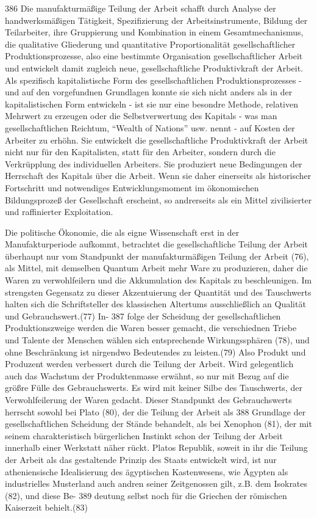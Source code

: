 {\num{386} Die manufakturmäßige Teilung der Arbeit
schafft durch Analyse der handwerksmäßigen Tätigkeit, Spezifizierung der
Arbeitsinstrumente, Bildung der Teilarbeiter, ihre Gruppierung und
Kombination in einem Gesamtmechanismus, die qualitative Gliederung und
quantitative Proportionalität gesellschaftlicher Produktionsprozesse,
also eine bestimmte Organisation gesellschaftlicher Arbeit und
entwickelt damit zugleich neue, gesellschaftliche Produktivkraft der
Arbeit. Als spezifisch kapitalistische Form des gesellschaftlichen
Produktionsprozesses - und auf den vorgefundnen Grundlagen konnte sie
sich nicht anders als in der kapitalistischen Form entwickeln - ist sie
nur eine besondre Methode, relativen Mehrwert zu erzeugen oder die
Selbstverwertung des Kapitals - was man gesellschaftlichen Reichtum,
``Wealth of Nations'' usw. nennt - auf Kosten der Arbeiter zu erhöhn.
Sie entwickelt die gesellschaftliche Produktivkraft der Arbeit nicht nur
für den Kapitalisten, statt für den Arbeiter, sondern durch die
Verkrüpplung des individuellen Arbeiters. Sie produziert neue
Bedingungen der Herrschaft des Kapitals über die Arbeit. Wenn sie daher
einerseits als historischer Fortschritt und notwendiges
Entwicklungsmoment im ökonomischen Bildungsprozeß der Gesellschaft
erscheint, so andrerseits als ein Mittel zivilisierter und raffinierter
Exploitation.

Die politische Ökonomie, die als eigne Wissenschaft erst in der
Manufakturperiode aufkommt, betrachtet die gesellschaftliche Teilung der
Arbeit überhaupt nur vom Standpunkt der manufakturmäßigen Teilung der
Arbeit (76), als Mittel, mit demselben Quantum Arbeit mehr Ware zu
produzieren, daher die Waren zu verwohlfeilern und die Akkumulation des
Kapitals zu beschleunigen. Im strengsten Gegensatz zu dieser
Akzentuierung der Quantität und des Tauschwerts halten sich die
Schriftsteller des klassischen Altertums ausschließlich an Qualität und
Gebrauchswert.(77) In- \num{387} folge der Scheidung
der gesellschaftlichen Produktionszweige werden die Waren besser
gemacht, die verschiednen Triebe und Talente der Menschen wählen sich
entsprechende Wirkungssphären (78), und ohne Beschränkung ist nirgendwo
Bedeutendes zu leisten.(79) Also Produkt und Produzent werden verbessert
durch die Teilung der Arbeit. Wird gelegentlich auch das Wachstum der
Produktenmasse erwähnt, so nur mit Bezug auf die größre Fülle des
Gebrauchswerts. Es wird mit keiner Silbe des Tauschwerts, der
Verwohlfeilerung der Waren gedacht. Dieser Standpunkt des Gebrauchswerts
herrscht sowohl bei Plato (80), der die Teilung der Arbeit als
\num{388} Grundlage der gesellschaftlichen Scheidung
der Stände behandelt, als bei Xenophon (81), der mit seinem
charakteristisch bürgerlichen Instinkt schon der Teilung der Arbeit
innerhalb einer Werkstatt näher rückt. Platos Republik, soweit in ihr
die Teilung der Arbeit als das gestaltende Prinzip des Staats entwickelt
wird, ist nur atheniensische Idealisierung des ägyptischen Kastenwesens,
wie Ägypten als industrielles Musterland auch andren seiner Zeitgenossen
gilt, z.B. dem Isokrates (82), und diese Be-
\num{389} deutung selbst noch für die Griechen der
römischen Kaiserzeit behielt.(83)

}
